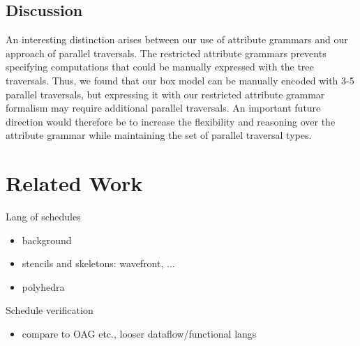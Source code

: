 \subsection{Discussion}
An interesting distinction arises between our use of attribute grammars and our approach of parallel traversals. The restricted attribute grammars prevents specifying computations that could be manually expressed with the tree traversals. Thus, we found that our box model can be manually encoded with 3-5 parallel traversals, but expressing it with our restricted attribute grammar formalism may require additional parallel traversals. An important future direction would therefore be to increase the flexibility and reasoning over the attribute grammar while maintaining the set of parallel traversal types.



\section{Related Work}
Lang of schedules
\begin{itemize}
\item background
\item stencils and skeletons: wavefront, ...
\item polyhedra
\end{itemize}
Schedule verification
\begin{itemize}
\item compare to OAG etc., looser dataflow/functional langs
\end{itemize}